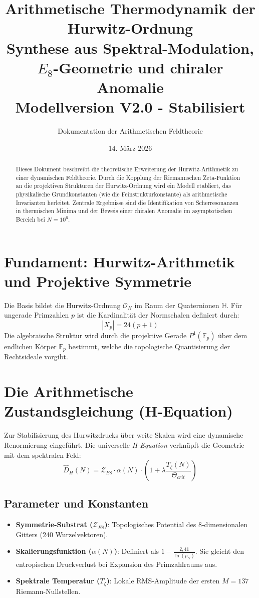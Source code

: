 \documentclass[11pt,a4paper]{article}
\title{
	\textbf{Arithmetische Thermodynamik der Hurwitz-Ordnung}\\
	\large Synthese aus Spektral-Modulation, $E_8$-Geometrie und chiraler Anomalie\\
	\vspace{0.5em}
	\small Modellversion V2.0 - Stabilisiert
}
\author{Dokumentation der Arithmetischen Feldtheorie}
\date{14. März 2026}
\begin{document}
	
	\maketitle
	
	\begin{abstract}
		Dieses Dokument beschreibt die theoretische Erweiterung der Hurwitz-Arithmetik zu einer dynamischen Feldtheorie. Durch die Kopplung der Riemannschen Zeta-Funktion an die projektiven Strukturen der Hurwitz-Ordnung wird ein Modell etabliert, das physikalische Grundkonstanten (wie die Feinstrukturkonstante) als arithmetische Invarianten herleitet. Zentrale Ergebnisse sind die Identifikation von Scherresonanzen in thermischen Minima und der Beweis einer chiralen Anomalie im asymptotischen Bereich bei $N=10^6$.
	\end{abstract}
	
	\tableofcontents
	\newpage
	
	\section{Fundament: Hurwitz-Arithmetik und Projektive Symmetrie}
	Die Basis bildet die Hurwitz-Ordnung $\mathcal{O}_H$ im Raum der Quaternionen $\mathbb{H}$. Für ungerade Primzahlen $p$ ist die Kardinalität der Normschalen definiert durch:
	\begin{equation}
		|X_p| = 24(p+1)
	\end{equation}
	Die algebraische Struktur wird durch die projektive Gerade $P^1(\mathbb{F}_p)$ über dem endlichen Körper $\mathbb{F}_p$ bestimmt, welche die topologische Quantisierung der Rechtsideale vorgibt.
	
	\section{Die Arithmetische Zustandsgleichung (H-Equation)}
	Zur Stabilisierung des Hurwitzdrucks über weite Skalen wird eine dynamische Renormierung eingeführt. Die universelle \textit{H-Equation} verknüpft die Geometrie mit dem spektralen Feld:
	\begin{equation}
		\hat{D}_H(N) = \mathcal{Z}_{E8} \cdot \alpha(N) \cdot \left( 1 + \lambda \frac{T_{\zeta}(N)}{\Theta_{crit}} \right)
	\end{equation}
	
	\subsection{Parameter und Konstanten}
	\begin{itemize}
		\item \textbf{Symmetrie-Substrat ($\mathcal{Z}_{E8}$)}: Topologisches Potential des 8-dimensionalen Gitters (240 Wurzelvektoren).
		\item \textbf{Skalierungsfunktion ($\alpha(N)$)}: Definiert als $1 - \frac{2,41}{\ln(p_N)}$. Sie gleicht den entropischen Druckverlust bei Expansion des Primzahlraums aus.
		\item \textbf{Spektrale Temperatur ($T_{\zeta}$)}: Lokale RMS-Amplitude der ersten $M=137$ Riemann-Nullstellen.
	\end{itemize}
	
\end{document}
